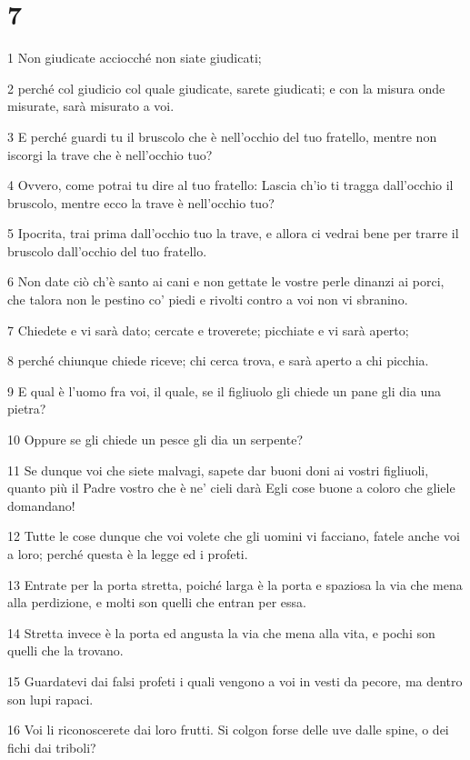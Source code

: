 \chapter{7}

\par 1 Non giudicate acciocché non siate giudicati;
\par 2 perché col giudicio col quale giudicate, sarete giudicati; e con la misura onde misurate, sarà misurato a voi.
\par 3 E perché guardi tu il bruscolo che è nell'occhio del tuo fratello, mentre non iscorgi la trave che è nell'occhio tuo?
\par 4 Ovvero, come potrai tu dire al tuo fratello: Lascia ch'io ti tragga dall'occhio il bruscolo, mentre ecco la trave è nell'occhio tuo?
\par 5 Ipocrita, trai prima dall'occhio tuo la trave, e allora ci vedrai bene per trarre il bruscolo dall'occhio del tuo fratello.
\par 6 Non date ciò ch'è santo ai cani e non gettate le vostre perle dinanzi ai porci, che talora non le pestino co' piedi e rivolti contro a voi non vi sbranino.
\par 7 Chiedete e vi sarà dato; cercate e troverete; picchiate e vi sarà aperto;
\par 8 perché chiunque chiede riceve; chi cerca trova, e sarà aperto a chi picchia.
\par 9 E qual è l'uomo fra voi, il quale, se il figliuolo gli chiede un pane gli dia una pietra?
\par 10 Oppure se gli chiede un pesce gli dia un serpente?
\par 11 Se dunque voi che siete malvagi, sapete dar buoni doni ai vostri figliuoli, quanto più il Padre vostro che è ne' cieli darà Egli cose buone a coloro che gliele domandano!
\par 12 Tutte le cose dunque che voi volete che gli uomini vi facciano, fatele anche voi a loro; perché questa è la legge ed i profeti.
\par 13 Entrate per la porta stretta, poiché larga è la porta e spaziosa la via che mena alla perdizione, e molti son quelli che entran per essa.
\par 14 Stretta invece è la porta ed angusta la via che mena alla vita, e pochi son quelli che la trovano.
\par 15 Guardatevi dai falsi profeti i quali vengono a voi in vesti da pecore, ma dentro son lupi rapaci.
\par 16 Voi li riconoscerete dai loro frutti. Si colgon forse delle uve dalle spine, o dei fichi dai triboli?
